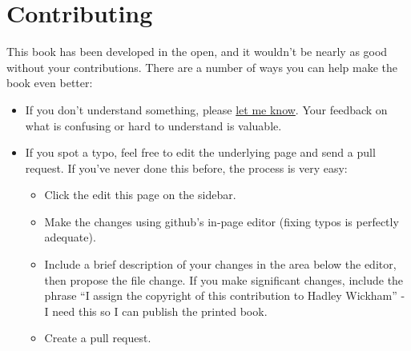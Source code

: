 \hypertarget{contributing}{%
\chapter{Contributing}\label{contributing}}

This book has been developed in the open, and it wouldn't be nearly as
good without your contributions. There are a number of ways you can help
make the book even better:

\begin{itemize}
\item
  If you don't understand something, please
  \href{mailto:h.wickham@gmail.com}{let me know}. Your feedback on what
  is confusing or hard to understand is valuable.
\item
  If you spot a typo, feel free to edit the underlying page and send a
  pull request. If you've never done this before, the process is very
  easy:

  \begin{itemize}
  \item
    Click the edit this page on the sidebar.
  \item
    Make the changes using github's in-page editor (fixing typos is
    perfectly adequate).
  \item
    Include a brief description of your changes in the area below the
    editor, then propose the file change. If you make significant
    changes, include the phrase ``I assign the copyright of this
    contribution to Hadley Wickham'' - I need this so I can publish the
    printed book.
  \item
    Create a pull request.
  \end{itemize}
\end{itemize}
